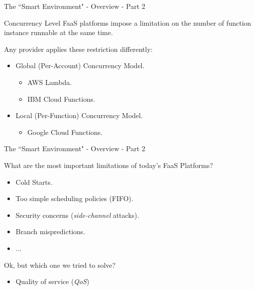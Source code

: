 \documentclass[13.5pt]{beamer}
\begin{document}
\begin{frame}{The ``Smart Environment" - Overview - Part 2}
	
	\begin{alertblock}{Concurrency Level}
		FaaS platforms impose a limitation on the number of function instance runnable at the same time.
	\end{alertblock}

	Any provider applies these restriction differently:
	\vspace{\baselineskip}
	\begin{itemize}
		\item Global (Per-Account) Concurrency Model.
		\begin{itemize}
			\item AWS Lambda. 
			\item IBM Cloud Functions.
		\end{itemize}
		\vspace{\baselineskip}
		\item Local (Per-Function) Concurrency Model.
		\begin{itemize}
			\item Google Cloud Functions.
		\end{itemize}
	\end{itemize}

\end{frame} 
\begin{frame}{The ``Smart Environment" - Overview - Part 2}
	
	\begin{block}{}
		What are the most important limitations of today’s FaaS Platforms?
	\end{block}

	\begin{itemize}
		\item Cold Starts.
		\item Too simple scheduling policies (FIFO).
		\item Security concerns (\textit{side-channel} attacks).
		\item Branch mispredictions.
		\item ...
	\end{itemize}

\begin{block}{}
	Ok, but which one we tried to solve?
\end{block}

	\begin{itemize}
		\item Quality of service (\textit{QoS})
	\end{itemize}

\end{frame} 
\end{document}

